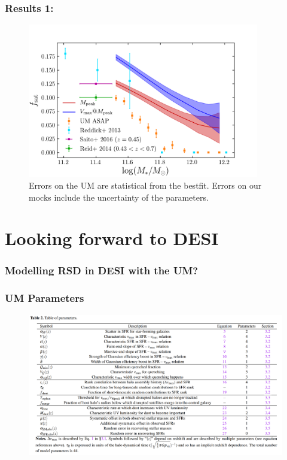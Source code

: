 \documentclass[t]{beamer}
\begin{document}
\begin{frame}
    \frametitle{Results 1: \fsat{}}

    \begin{figure}
    \includegraphics[width=0.9\textwidth]{images/sat_frac.png}
    \caption{Errors on the UM are statistical from the bestfit. Errors on our mocks include the uncertainty of the parameters.}
    \end{figure}
\end{frame}



\section{Looking forward to DESI}

\begin{frame}
    \frametitle{Modelling RSD in DESI with the UM?}
\end{frame}

\begin{frame}
    \frametitle{UM Parameters}
    \begin{figure}
    \includegraphics[width=\textwidth]{other_images/um_params.png}
    \end{figure}
\end{frame}
\end{document}
